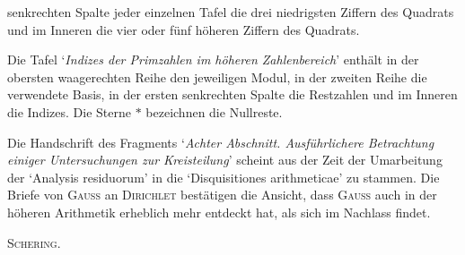 senkrechten Spalte jeder einzelnen Tafel die drei niedrigsten Ziffern des Quadrats und im Inneren die vier oder fünf höheren Ziffern des Quadrats.
\par Die Tafel ‘\textit{Indizes der Primzahlen im höheren Zahlenbereich}’ enthält in der obersten waagerechten Reihe den jeweiligen Modul, in der zweiten Reihe die verwendete Basis, in der ersten senkrechten Spalte die Restzahlen und im Inneren die Indizes. Die Sterne $*$ bezeichnen die Nullreste.
\par Die Handschrift des Fragments ‘\textit{Achter Abschnitt. Ausführlichere Betrachtung einiger Untersuchungen zur Kreisteilung}’ scheint aus der Zeit der Umarbeitung der ‘Analysis residuorum’ in die ‘Disquisitiones arithmeticae’ zu stammen. Die Briefe von \textsc{Gauss} an \textsc{Dirichlet} bestätigen die Ansicht, dass \textsc{Gauss} auch in der höheren Arithmetik erheblich mehr entdeckt hat, als sich im Nachlass findet.
\begin{flushright}\textsc{Schering}.\end{flushright}
